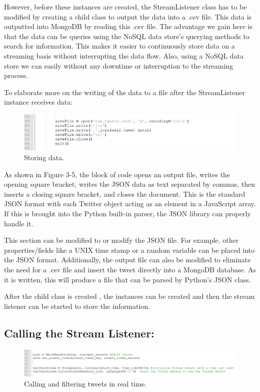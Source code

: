 However, before these instances are created, the StreamListener class has to be modified by creating a child class to output the data into a .csv file. This data is outputted into MongoDB by reading this .csv file. The advantage we gain here is that the data can be queries using the NoSQL data store's querying methods to search for information. This makes it easier to continuously store data on a streaming basis without interrupting the data flow. Also, using a NoSQL data store we can easily without any downtime or interruption to the streaming process.

To elaborate more on the writing of the data to a file after the StreamListener instance receives data:

\begin{figure}[ht!]
	\centering
	\includegraphics[width=200mm]{code51.png}
	\caption{Storing data. \label{overflow}}
\end{figure}

As shown in Figure 3-5, the block of code opens an output file, writes the opening square bracket, writes the JSON data as text separated by commas, then inserts a closing square bracket, and closes the document. This is the standard JSON format with each Twitter object acting as an element in a JavaScript array. If this is brought into the Python built-in parser, the JSON library can properly handle it.

This section can be modified to or modify the JSON file. For example, other properties/fields like a UNIX time stamp or a random variable can be placed into the JSON format. Additionally, the output file can also be modified to eliminate the need for a .csv file and insert the tweet directly into a MongoDB database. As it is written, this will produce a file that can be parsed by Python's JSON class.

After the child class is created , the instances can be created and then the stream listener can be started to store the information.

\subsection{Calling the Stream Listener:}

\begin{figure}[ht!]
	\centering
	\includegraphics[width=150mm]{code61.png}
	\caption{Calling and filtering tweets in real time. \label{overflow}}
\end{figure}

